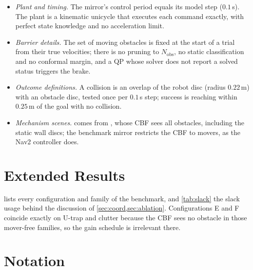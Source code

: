 \begin{itemize}
    \item \emph{Plant and timing.} The mirror's control period equals its model step ($0.1$\,s). The plant is a kinematic unicycle that executes each command exactly, with perfect state knowledge and no acceleration limit.
    \item \emph{Barrier details.} The set of moving obstacles is fixed at the start of a trial from their true velocities; there is no pruning to $N_{\mathrm{obs}}$, no static classification and no conformal margin, and a QP whose solver does not report a solved status triggers the brake.
    \item \emph{Outcome definitions.} A collision is an overlap of the robot disc (radius $0.22$\,m) with an obstacle disc, tested once per $0.1$\,s step; success is reaching within $0.25$\,m of the goal with no collision.
    \item \emph{Mechanism scenes.}  comes from , whose CBF sees all obstacles, including the static wall discs; the benchmark mirror restricts the CBF to movers, as the Nav2 controller does.
\end{itemize}

\section{Extended Results}\label{app:results}




 lists every configuration and family of the benchmark, and \cref{tab:slack} the slack usage behind the discussion of \cref{sec:coord,sec:ablation}. Configurations E and F coincide exactly on U-trap and clutter because the CBF sees no obstacle in those mover-free families, so the gain schedule is irrelevant there.

\section{Notation}\label{app:notation}


